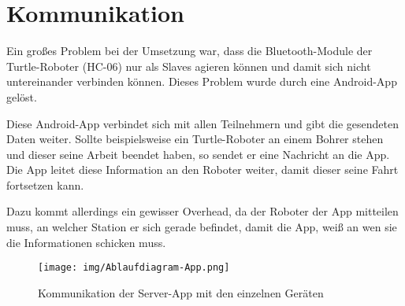\section{Kommunikation}
Ein großes Problem bei der Umsetzung war, dass die Bluetooth-Module der Turtle-Roboter (HC-06) nur als Slaves agieren können und damit sich nicht untereinander verbinden können. Dieses Problem wurde durch eine Android-App gelöst.

Diese Android-App verbindet sich mit allen Teilnehmern und gibt die gesendeten Daten weiter. Sollte beispielsweise ein Turtle-Roboter an einem Bohrer stehen und dieser seine Arbeit beendet haben, so sendet er eine Nachricht an die App. Die App leitet diese Information an den Roboter weiter, damit dieser seine Fahrt fortsetzen kann.

Dazu kommt allerdings ein gewisser Overhead, da der Roboter der App mitteilen muss, an welcher Station er sich gerade befindet, damit die App, weiß an wen sie die Informationen schicken muss.
\begin{figure}[h]
\begin{center}
\texttt{[image: img/Ablaufdiagram-App.png]}
\caption{Kommunikation der Server-App mit den einzelnen Geräten}
\end{center}
\end{figure}
